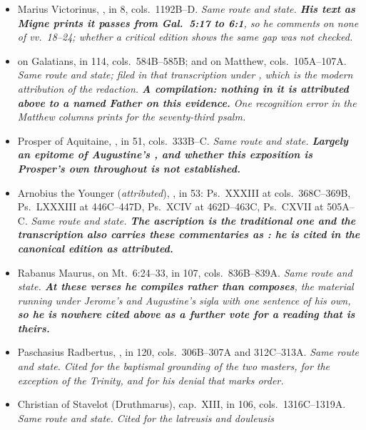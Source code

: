 \begin{itemize}[leftmargin=1.2em, itemsep=0.15em]
{{other lists.}}
\item Marius Victorinus, , in
 8, cols.~1192B--D. \textit{Same route and state.
\textbf{His text as Migne prints it passes from Gal.\ 5:17 to 6:1}, so he
comments on none of vv.~18--24; whether a critical edition shows the same gap
was not checked.}
\item {} on Galatians, in  114,
cols.~584B--585B; and on Matthew, cols.~105A--107A. \textit{Same route and
state; filed in that transcription under , which is the modern attribution of the redaction. \textbf{A
compilation: nothing in it is attributed above to a named Father on this
evidence.} One recognition error in the Matthew columns prints
 for the seventy-third psalm.}
\item Prosper of Aquitaine, , in  51, cols.~333B--C. \textit{Same route and state. \textbf{Largely an
epitome of Augustine's , and whether this exposition is
Prosper's own throughout is not established.}}
\item Arnobius the Younger (\emph{attributed}), ,
in  53: Ps.~XXXIII at cols.~368C--369B, Ps.~LXXXIII at
446C--447D, Ps.~XCIV at 462D--463C, Ps.~CXVII at 505A--C. \textit{Same route
and state. \textbf{The ascription is the traditional one and the transcription
also carries these commentaries as : he is cited in the canonical
edition as attributed.}}
\item Rabanus Maurus, on Mt.\ 6:24--33, in  107,
cols.~836B--839A. \textit{Same route and state. \textbf{At these verses he
compiles rather than composes}, the material running under Jerome's and
Augustine's sigla with one sentence of his own, \textbf{so he is nowhere cited
above as a further vote for a reading that is theirs.}}
\item Paschasius Radbertus, , in  120, cols.~306B--307A and 312C--313A. \textit{Same route and state.
Cited for the baptismal grounding of the two masters, for the exception of the
Trinity, and for his denial that  marks order.}
\item Christian of Stavelot (Druthmarus), 
cap.~XIII, in  106, cols.~1316C--1319A. \textit{Same
route and state. Cited for the \emph{latreusis} and \emph{douleusis}
}
\end{itemize}
